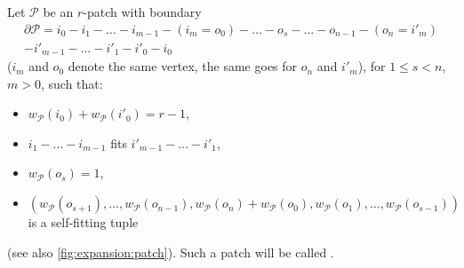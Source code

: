 \begin{definition}\label{def:expansion:patch} Let $\mathcal{P}$ be an $r$-patch with boundary
\begin{multline*}
  \partial\mathcal{P} = i_0 - i_1 - \dots - i_{m-1} - (i_m = o_0) - \dots - o_s - \dots - o_{n - 1} - (o_n = i'_m) \\
  - i'_{m-1} - \dots - i'_1 - i'_0 - i_0
\end{multline*}
($i_m$ and $o_0$ denote the same vertex, the same goes for $o_n$ and $i'_m$), for $1 \leq s < n$, $m > 0$, such that:
  \begin{itemize}
  \item $w_{\mathcal{P}}(i_0) + w_{\mathcal{P}}(i'_0) = r - 1$,
  \item $i_1 - \dots - i_{m-1}$ fits $i'_{m-1} - \dots - i'_1$,
  \item $w_{\mathcal{P}}(o_s) = 1$,
  \item $(w_{\mathcal{P}}(o_{s + 1}), \dots, w_{\mathcal{P}}(o_{n - 1}), w_{\mathcal{P}}(o_n) + w_{\mathcal{P}}(o_0), w_{\mathcal{P}}(o_1), \dots, w_{\mathcal{P}}(o_{s - 1}))$ is a self-fitting tuple
  \end{itemize}
  (see also \autoref{fig:expansion:patch}). Such a patch will be called .
\end{definition}

